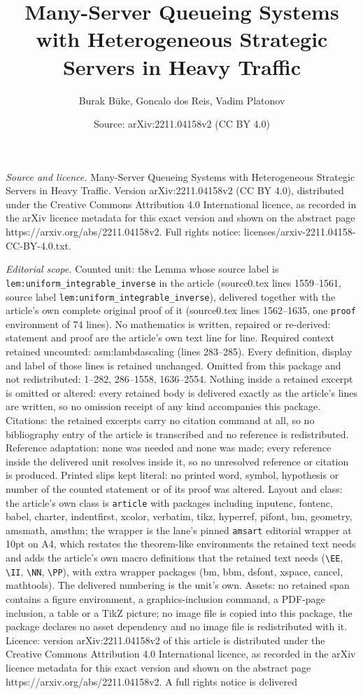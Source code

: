 \documentclass[10pt,a4paper]{amsart}
\title[Many-Server Queueing Systems with Heterogeneous Strategic Se]{Many-Server Queueing Systems with Heterogeneous Strategic Servers in Heavy Traffic}
\author{Burak B\"uke, Goncalo dos Reis, Vadim Platonov}
\date{Source: arXiv:2211.04158v2 (CC BY 4.0)}
\begin{document}
\maketitle

\noindent\emph{Source and licence.} Many-Server Queueing Systems with Heterogeneous Strategic Servers in Heavy Traffic. Version arXiv:2211.04158v2 (CC BY 4.0), distributed under the Creative Commons Attribution 4.0 International licence, as recorded in the arXiv licence metadata for this exact version and shown on the abstract page https://arxiv.org/abs/2211.04158v2. Full rights notice: licenses/arxiv-2211.04158-CC-BY-4.0.txt.\par\smallskip

\noindent\textit{Editorial scope.} Counted unit: the Lemma whose source label is \texttt{lem:uniform\_integrable\_inverse} in the article (source0.tex lines 1559--1561, source label \texttt{lem:uniform\_integrable\_inverse}), delivered together with the article's own complete original proof of it (source0.tex lines 1562--1635, one \texttt{proof} environment of 74 lines). No mathematics is written, repaired or re-derived: statement and proof are the article's own text line for line. Required context retained uncounted: asm:lambdascaling (lines 283--285). Every definition, display and label of those lines is retained unchanged. Omitted from this package and not redistributed: 1--282, 286--1558, 1636--2554. Nothing inside a retained excerpt is omitted or altered: every retained body is delivered exactly as the article's lines are written, so no omission receipt of any kind accompanies this package. Citations: the retained excerpts carry no citation command at all, so no bibliography entry of the article is transcribed and no reference is redistributed. Reference adaptation: none was needed and none was made; every reference inside the delivered unit resolves inside it, so no unresolved reference or citation is produced. Printed slips kept literal: no printed word, symbol, hypothesis or number of the counted statement or of its proof was altered. Layout and class: the article's own class is \texttt{article} with packages including inputenc, fontenc, babel, charter, indentfirst, xcolor, verbatim, tikz, hyperref, pifont, bm, geometry, amsmath, amsthm; the wrapper is the lane's pinned \texttt{amsart} editorial wrapper at 10pt on A4, which restates the theorem-like environments the retained text needs and adds the article's own macro definitions that the retained text needs (\texttt{\textbackslash EE}, \texttt{\textbackslash II}, \texttt{\textbackslash NN}, \texttt{\textbackslash PP}), with extra wrapper packages (bm, bbm, dsfont, xspace, cancel, mathtools). The delivered numbering is the unit's own. Assets: no retained span contains a figure environment, a graphics-inclusion command, a PDF-page inclusion, a table or a TikZ picture; no image file is copied into this package, the package declares no asset dependency and no image file is redistributed with it. Licence: version arXiv:2211.04158v2 of this article is distributed under the Creative Commons Attribution 4.0 International licence, as recorded in the arXiv licence metadata for this exact version and shown on the abstract page https://arxiv.org/abs/2211.04158v2. A full rights notice is delivered 
\end{document}
